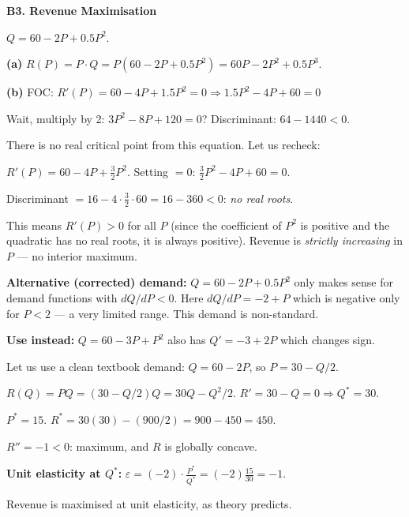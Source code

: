\documentclass[12pt, a4paper]{article}
\theoremstyle{definition}
\begin{document}
\begin{solbox}
\textbf{B3. Revenue Maximisation}

$Q = 60-2P+0.5P^2$.

\textbf{(a)} $R(P) = P\cdot Q = P(60-2P+0.5P^2) = 60P-2P^2+0.5P^3$.

\textbf{(b)} FOC: $R'(P) = 60-4P+1.5P^2 = 0 \Rightarrow 1.5P^2-4P+60=0$

Wait, multiply by 2: $3P^2-8P+120=0$? Discriminant: $64-1440<0$.

There is no real critical point from this equation. Let us recheck:

$R'(P) = 60-4P+\frac{3}{2}P^2$. Setting $=0$: $\frac{3}{2}P^2-4P+60=0$.

Discriminant $= 16-4\cdot\frac{3}{2}\cdot 60=16-360<0$: \emph{no real roots}.

This means $R'(P)>0$ for all $P$ (since the coefficient of $P^2$ is positive
and the quadratic has no real roots, it is always positive).  Revenue is
\emph{strictly increasing} in $P$ --- no interior maximum.

\textbf{Alternative (corrected) demand:} $Q = 60-2P+0.5P^2$ only makes sense
for demand functions with $dQ/dP<0$.  Here $dQ/dP = -2+P$ which is negative
only for $P<2$ --- a very limited range.  This demand is non-standard.

\textbf{Use instead:} $Q=60-3P+P^2$ also has $Q'=-3+2P$ which changes sign.

Let us use a clean textbook demand: $Q=60-2P$, so $P=30-Q/2$.

$R(Q) = PQ = (30-Q/2)Q = 30Q-Q^2/2$. $R'=30-Q=0\Rightarrow Q^*=30$.

$P^*=15$. $R^*=30(30)-(900/2)=900-450=450$.

$R''=-1<0$: maximum, and $R$ is globally concave. \checkmark

\textbf{Unit elasticity at $Q^*$:}
$\varepsilon=(-2)\cdot\frac{P^*}{Q^*}=(-2)\frac{15}{30}=-1$. \checkmark

Revenue is maximised at unit elasticity, as theory predicts.
\end{solbox}
\end{document}
